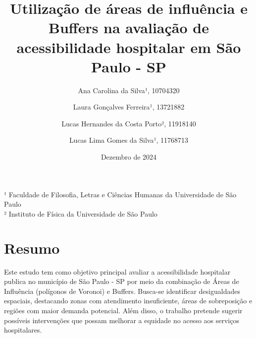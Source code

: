 \documentclass[
  8pt,
]{article}
\title{Utilização de áreas de influência e Buffers na avaliação de
acessibilidade hospitalar em São Paulo - SP}
\author{Ana Carolina da Silva¹, 10704320 \and Laura Gonçalves Ferreira¹,
13721882 \and Lucas Hernandes da Costa Porto², 11918140 \and Lucas Lima
Gomes da Silva¹, 11768713}
\date{Dezembro de 2024}
\begin{document}
\maketitle
¹ Faculdade de Filosofia, Letras e Ciências Humanas da Universidade de São Paulo \\
² Instituto de Física da Universidade de São Paulo

\section{Resumo}\label{resumo}

Este estudo tem como objetivo principal avaliar a acessibilidade
hospitalar publica no município de São Paulo - SP por meio da combinação
de Áreas de Influência (polígonos de Voronoi) e Buffers. Busca-se
identificar desigualdades espaciais, destacando zonas com atendimento
insuficiente, áreas de sobreposição e regiões com maior demanda
potencial. Além disso, o trabalho pretende sugerir possíveis
intervenções que possam melhorar a equidade no acesso aos serviços
hospitalares.

\vspace{1cm}
\end{document}
